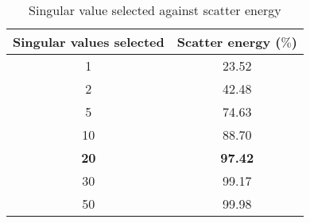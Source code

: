 \begin{table}[!htbp]
    \centering
    \begin{tabular}{|c|c|}
        \hline
        Singular values selected & Scatter energy ($\%$) \\\hline
         1 & 23.52\\
         2 & 42.48\\
         5 & 74.63\\
         10 & 88.70\\
         \textbf{20} & \textbf{97.42}\\
         30 & 99.17\\
         50 & 99.98\\ \hline
    \end{tabular}
    \caption{Singular value selected against scatter energy}
    \label{scatter_energy}
\end{table}